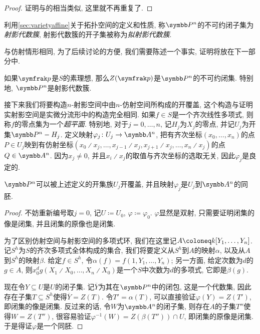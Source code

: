 \begin{proof}
  证明与的相当类似, 这里就不再重复了.
\end{proof}

\begin{definition}
  利用\ref{sec:varietyaffine}关于拓扑空间的定义和性质, 称$\PP^n$的不可约闭子集为\emph{射影代数簇}, 射影代数簇的开子集被称为\emph{拟射影代数簇}.
\end{definition}

与仿射情形相同, 为了后续讨论的方便, 我们需要陈述一个事实, 证明将放在下一部分中.

\begin{proposition}\label{prop:projectiveprimeirreducible}
  如果$\ideal{p}$是$S$的素理想, 那么$Z(\ideal{p})$是$\PP^n$的不可约闭集. 特别地, $\PP^n$是射影代数簇.
\end{proposition}

接下来我们将要构造$n$-射影空间中由$n$-仿射空间所构成的开覆盖, 这个构造与证明实射影空间是实微分流形中的构造完全相同. 如果$f\in S$是一个齐次线性多项式, 则称$f$的零点集为一个\emph{超平面}. 特别地, 对于$j=0, \dotsc, n$, 记$H_j$为$X_j$的零点, 并记$U_j$为开集$\PP^n-H_j$. 定义映射$\varphi_j\colon U_j\to \AF^n$, 把有齐次坐标$(x_0, \dotsc, x_n)$的点$P\in U_j$映到有仿射坐标$(x_0{\divslash}x_j, \dotsc, x_{j-1}{\divslash}x_j, x_{j+1}{\divslash}x_j, \dotsc,  x_n{\divslash}x_j)$的点$Q\in \AF^n$. 因为$x_j\neq 0$, 并且$x_i{\divslash}x_j$的取值与齐次坐标的选取无关, 因此$\varphi_j$是良定的.

\begin{proposition}\label{prop:projspaceopencoverhomeo}
  $\PP^n$可以被上述定义的开集族$U_j$开覆盖, 并且映射$\varphi_j$是$U_j$到$\AF^n$的同胚.
\end{proposition}

\begin{proof}
  不妨重新编号取$j=0$, 记$U\coloneq U_0$, $\varphi\coloneq \varphi_0$. $\varphi$显然是双射, 只需要证明闭集的像是闭集, 并且闭集的原像也是闭集.

  为了区别仿射空间与射影空间的多项式环, 我们在这里记$A\coloneq \kk [Y_1, \dotsc, Y_n]$. 记$S^h$为$S$的齐次多项式全体构成的集合, 我们将要定义从$S^h$到$A$的映射$\alpha$, 以及从$A$到$S^h$的映射$\beta$. 给定$f\in S^h$, 令$\alpha(f)=f(1, Y_1, \dotsc, Y_n)$; 另一方面, 给定次数为$d$的$g\in A$, 则$x_0^dg(X_1{\divslash}X_0, \dotsc, X_n{\divslash}X_0)$是一个$S$中次数为$d$的多项式, 它即是$\beta(g)$.

  现在令$Y\subseteq U$是$U$的闭子集. 记$\overline{Y}$为其在$\PP^n$中的闭包, 这是一个代数集, 因此存在子集$T\subseteq S^h$使得$\overline{Y}=Z(T)$. 令$T'=\alpha(T)$, 可以直接验证$\varphi(Y)=Z(T')$, 即闭集的像是闭集. 反过来的话, 令$W$为$\AF^n$的闭子集, 则存在$A$的子集$T''$使得$W=Z(T'')$, 很容易验证$\varphi^{-1}(W) = Z(\beta(T''))\cap U$, 即闭集的原像是闭集. 于是得证$\varphi$是一个同胚.
\end{proof}

